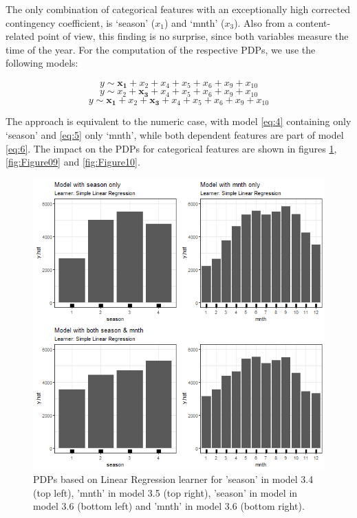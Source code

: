 \documentclass[]{krantz}
\begin{document}
The only combination of categorical features with an exceptionally high
corrected contingency coefficient, is `season' (\(x_1\)) and `mnth'
(\(x_3\)). Also from a content-related point of view, this finding is no
surprise, since both variables measure the time of the year. For the
computation of the respective PDPs, we use the following models:

\begin{equation} 
y \sim \mathbf{x_1} + x_2 + x_4 + x_5 + x_6 + x_9 + x_{10} \label{eq:4}
\end{equation}\begin{equation}
y \sim x_2 +\mathbf{x_3} + x_4 + x_5 + x_6 + x_9 + x_{10} \label{eq:5}
\end{equation}\begin{equation}
y \sim \mathbf{x_1} + x_2 + \mathbf{x_3} + x_4 + x_5 + x_6 + x_9 + x_{10} \label{eq:6}
\end{equation}

The approach is equivalent to the numeric case, with model \eqref{eq:4}
containing only `season' and \eqref{eq:5} only `mnth', while both
dependent features are part of model \eqref{eq:6}. The impact on the PDPs
for categorical features are shown in figures \ref{fig:Figure08},
\ref{fig:Figure09} and \ref{fig:Figure10}.

\begin{figure}

{\centering \includegraphics[width=0.8\linewidth]{images/VK_PDP_8_Correlated_categorical_LM} 

}

\caption{PDPs based on Linear Regression learner for 'season' in model 3.4 (top left), 'mnth' in model 3.5 (top right), 'season' in model in model 3.6 (bottom left) and 'mnth' in model 3.6 (bottom right).}\label{fig:Figure08}
\end{figure}
\end{document}
